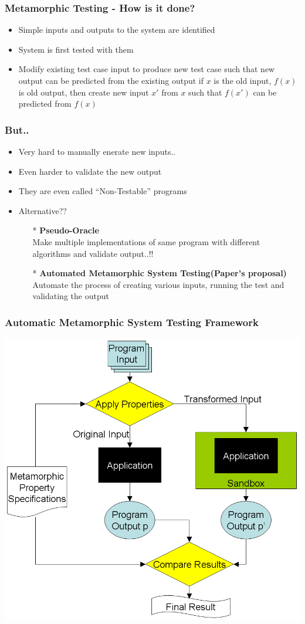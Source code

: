 \documentclass[compress,red]{beamer}
\begin{document}
\frame
{

	\frametitle{Metamorphic Testing - How is it done?}
	\begin{itemize}
		\item Simple inputs and outputs to the system are identified
		\pause
		\item System is first tested with them
		\pause
		\item Modify existing test case input to produce new test case such that new output can be predicted from the existing output
		if $x$ is the old input, $f(x)$ is old output, then create new input $x'$ from $x$ such that $f(x')$ can be predicted from $f(x)$
	\end{itemize}
}

\frame
{
	\frametitle{But..}
	\begin{itemize}
		\item Very hard to manually enerate new inputs..
		\pause
		\item Even harder to validate the new output
		\pause
		\item
		They are even called ``Non-Testable'' programs
		\item Alternative??
		\pause
		\begin{itemize}
			\item[*] \textbf{Pseudo-Oracle} \\
				Make multiple implementations of same program with different algorithms and validate output..!! 
			\item[*] \textbf{Automated Metamorphic System Testing(Paper's proposal)} \\
				Automate the process of creating various inputs, running the test and validating the output
		\end{itemize}
	\end{itemize}
}

\frame
{
	\frametitle{Automatic Metamorphic System Testing Framework}
	\begin{center}
	\includegraphics[scale=0.25]{amst-framework.png}
	\end{center}
}
\end{document}
